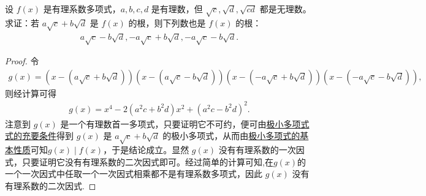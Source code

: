 \documentclass[../../main.tex]{subfiles}%
\begin{document}
\begin{example}
设 $f(x)$ 是有理系数多项式，$a, b, c, d$ 是有理数，但 $\sqrt{c}, \sqrt{d}, \sqrt{cd}$ 都是无理数。求证：若 $a\sqrt{c} + b\sqrt{d}$ 是 $f(x)$ 的根，则下列数也是 $f(x)$ 的根：
\begin{align*}
a\sqrt{c} - b\sqrt{d}, -a\sqrt{c} + b\sqrt{d}, -a\sqrt{c} - b\sqrt{d}.
\end{align*}
\end{example}
\begin{proof}

令
\begin{align*}
g(x) = (x - (a\sqrt{c} + b\sqrt{d}))(x - (a\sqrt{c} - b\sqrt{d}))(x - (-a\sqrt{c} + b\sqrt{d}))(x - (-a\sqrt{c} - b\sqrt{d})),
\end{align*}
则经计算可得
\begin{align*}
g(x) = x^4 - 2(a^2 c + b^2 d)x^2 + (a^2 c - b^2 d)^2.
\end{align*}
注意到 $g(x)$ 是一个有理数首一多项式，只要证明它不可约，便可由\hyperref[proposition:极小多项式式的充要条件]{极小多项式式的充要条件}得到 $g(x)$ 是 $a\sqrt{c} + b\sqrt{d}$ 的极小多项式，从而由\hyperref[proposition:极小多项式的基本性质]{极小多项式的基本性质}可知$g(x) \mid f(x)$，于是结论成立。显然 $g(x)$ 没有有理系数的一次因式，只要证明它没有有理系数的二次因式即可。经过简单的计算可知,在$g(x)$的一个一次因式中任取一个一次因式相乘都不是有理系数多项式，因此 $g(x)$ 没有有理系数的二次因式.

\end{proof}
\end{document}
